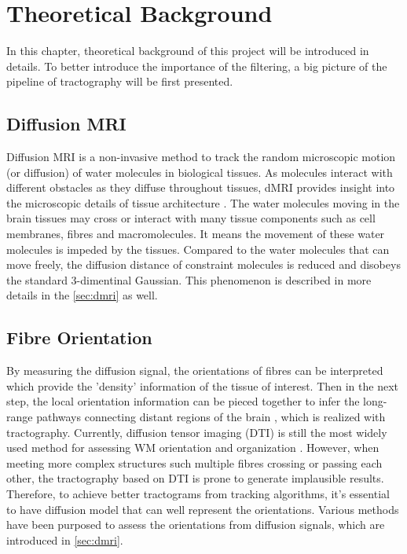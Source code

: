 \chapter{Theoretical Background}


In this chapter, theoretical background of this project will be introduced in details. To better introduce the importance of the filtering, a big picture of the pipeline of tractography will be first presented. 

\section{Diffusion MRI}

Diffusion MRI is a non-invasive method to track the random microscopic motion (or diffusion) of water molecules in biological tissues. 
As molecules interact with different obstacles as they diffuse throughout tissues, 
dMRI provides insight into the microscopic details of tissue architecture \cite{newmanChapterMorphologicalBrain2014}. 
The water molecules moving in the brain tissues may cross or interact with many tissue components such as cell membranes, fibres and macromolecules. \cite{lebihanLookingFunctionalArchitecture2003}
It means the movement of these water molecules is impeded by the tissues. 
Compared to the water molecules that can move freely, 
the diffusion distance of constraint molecules is reduced and disobeys the standard 3-dimentinal Gaussian. 
This phenomenon is described in more details in the \ref{sec:dmri} as well.

\section{Fibre Orientation}
By measuring the diffusion signal, the orientations of fibres can be interpreted which provide the 'density' information of the tissue of interest.
Then in the next step, the local orientation information can be pieced together to infer the long-range pathways connecting distant regions of the brain \cite{lebihanLookingFunctionalArchitecture2003}, 
which is realized with tractography. 
Currently, diffusion tensor imaging (DTI) is still the most widely used method for assessing WM orientation and organization \cite{basserEstimationEffectiveSelfDiffusion1994}.
However, when meeting more complex structures such multiple fibres crossing or passing each other, the tractography based on DTI is prone to 
generate implausible results. Therefore, to achieve better tractograms from tracking algorithms, it's essential to have diffusion model that can 
well represent the orientations. Various methods have been purposed to assess the orientations from diffusion signals, which are introduced in \ref{sec:dmri}.

